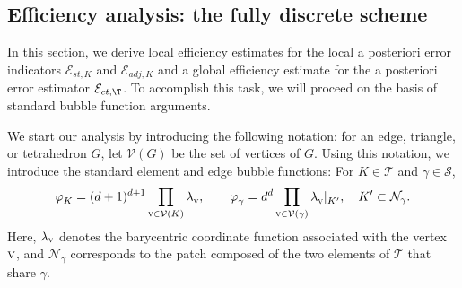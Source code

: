 \documentclass[final]{siamart0216}
\begin{document}

\subsection{Efficiency analysis: the fully discrete scheme}\label{efficiency_fully}

In this section, we derive local efficiency estimates for the local a posteriori error indicators $\mathcal{E}_{st,K}$ and $\mathcal{E}_{adj,K}$ and a global efficiency estimate for the a posteriori error estimator $\mathcal{E}_{ct,\T}$. To accomplish this task, we will proceed on the basis of standard bubble function arguments. 

We start our analysis by introducing the following notation: for an edge, triangle, or tetrahedron $G$, let $\mathcal{V}(G)$ be the set of vertices of $G$. Using this notation, we introduce the standard element and edge bubble functions: For $K\in\mathscr{T}$ and $\gamma\in\mathscr{S}$, 
\begin{equation}\label{def:standard_bubbles}
\varphi^{}_{K}=
(d+1)^{d+1}\prod_{\textsc{v} \in \mathcal{V}(K)} \lambda^{}_{\textsc{v}},
\qquad
\varphi^{}_{\gamma}=
d^d \prod_{\textsc{v} \in \mathcal{V}(\gamma)}\lambda^{}_{\textsc{v}}|^{}_{K'},
\quad 
K' \subset \mathcal{N}_{\gamma}.
\end{equation} 
Here, $\lambda_{\textsc{v}}$ denotes the barycentric coordinate function associated with the vertex $\textsc{v}$, and $\mathcal{N}_{\gamma}$ corresponds to the patch composed of the two elements of $\mathscr{T}$ that share $\gamma$.
\end{document}
